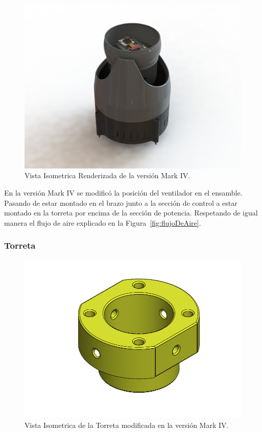     \begin{figure}[H]
    \centering
    \begin{adjustbox}{width=0.7\linewidth}
      \includegraphics{media/markiv/vista_isometricaf.png}
    \end{adjustbox}
    \caption{\label{fig:Mark04} Vista Isometrica Renderizada de la versión Mark IV.}
    \end{figure}

    En la versión Mark IV se modificó la posición del ventilador en el ensamble. Pasando de estar montado en el brazo junto a la sección de control a estar montado en la torreta por encima de la sección de potencia. Respetando de igual manera el flujo de aire explicado en la Figura~\ref{fig:flujoDeAire}.
    
    \subsubsection{Torreta}

    \begin{figure}[H]
    \centering
    \begin{adjustbox}{width=0.7\linewidth}
      \includegraphics{media/markiv/torreta.png}
    \end{adjustbox}
    \caption{\label{fig:torretaMarkIV} Vista Isometrica de la Torreta modificada en la versión Mark IV.}
    \end{figure}
    
